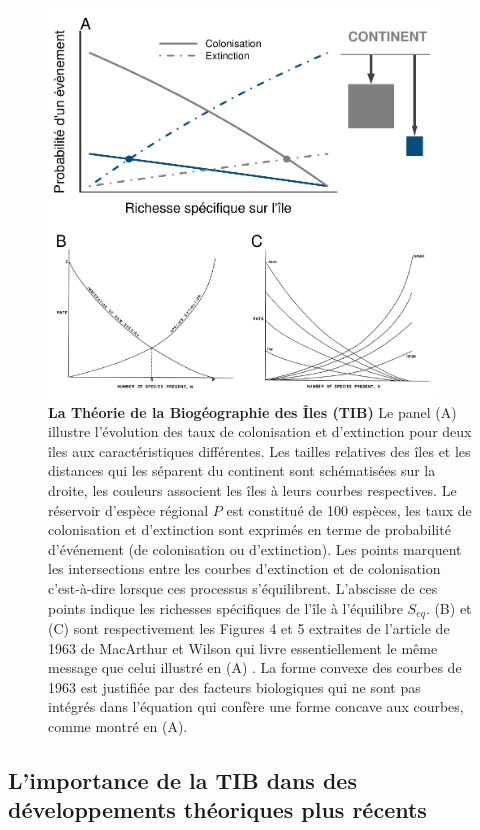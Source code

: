 \begin{figure}[htbp]
\centering
\includegraphics[width=0.92000\textwidth]{fig/fig1.pdf}
\caption[La Théorie de la Biogéographie des Iles (TIB)]{\textbf{La Théorie de la Biogéographie des Îles (TIB)} Le panel
(A) illustre l'évolution des taux de colonisation et d'extinction pour
deux îles aux caractéristiques différentes. Les tailles relatives des
îles et les distances qui les séparent du continent sont schématisées
sur la droite, les couleurs associent les îles à leurs courbes
respectives. Le réservoir d'espèce régional \(P\) est constitué de 100
espèces, les taux de colonisation et d'extinction sont exprimés en terme
de probabilité d'événement (de colonisation ou d'extinction). Les points
marquent les intersections entre les courbes d'extinction et de
colonisation c'est-à-dire lorsque ces processus s'équilibrent.
L'abscisse de ces points indique les richesses spécifiques de l'île à
l'équilibre \(S_{eq}\). (B) et (C) sont respectivement les Figures 4 et
5 extraites de l'article de 1963 de MacArthur et Wilson qui livre
essentiellement le même message que celui illustré en (A)
\citep{MacArthur1963}. La forme convexe des courbes de 1963 est
justifiée par des facteurs biologiques qui ne sont pas intégrés dans
l'équation \label{eqMW} qui confère une forme concave aux courbes, comme
montré en (A).\label{fig:figMW}}
\end{figure}

\subsection*{L'importance de la TIB dans des développements théoriques
plus
récents}\label{limportance-de-la-tib-dans-des-duxe9veloppements-thuxe9oriques-plus-ruxe9cents}

